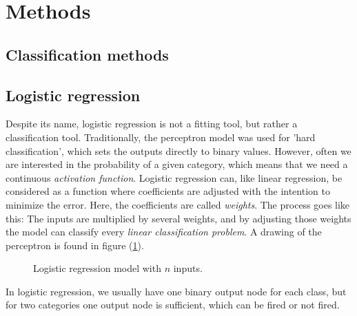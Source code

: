 \section{Methods} \label{sec:methods}

\subsection{Classification methods}

\subsection{Logistic regression}
Despite its name, logistic regression is not a fitting tool, but rather a classification tool. Traditionally, the perceptron model was used for 'hard classification', which sets the outputs directly to binary values. However, often we are interested in the probability of a given category, which means that we need a continuous \textit{activation function}. Logistic regression can, like linear regression, be considered as a function where coefficients are adjusted with the intention to minimize the error. Here, the coefficients are called \textit{weights}. The process goes like this: The inputs are multiplied by several weights, and by adjusting those weights the model can classify every \textit{linear classification problem}. A drawing of the perceptron is found in figure (\ref{fig:single_perceptron}).

\begin{figure} [H]
	\centering
	\caption{Logistic regression model with $n$ inputs.}
	\label{fig:single_perceptron}
\end{figure}
In logistic regression, we usually have one binary output node for each class, but for two categories one output node is sufficient, which can be fired or not fired. 

